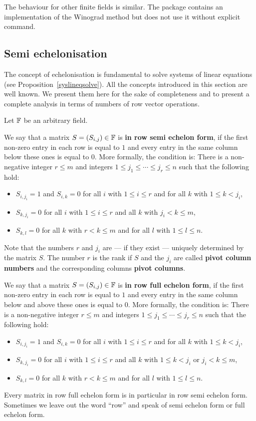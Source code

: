 The behaviour for other finite fields is similar. The {\cvec} package
contains an implementation of the Winograd method but does not use
it without explicit command.


\subsection{Semi echelonisation}

The concept of echelonisation is fundamental to solve systems of linear
equations (see Proposition~\ref{syslineqsolve}). All the concepts
introduced in this section are well known. We present them here for
the sake of completeness and to present a complete analysis in terms
of numbers of row vector operations.

\begin{Def}
Let $\mathbb{F}$ be an arbitrary field. 

We say that a matrix $S = (S_{i,j}) \in \mathbb{F}$
is \textbf{in row semi echelon form}, if the first non-zero entry in each
row is equal to $1$ and every entry in the same column below these ones
is equal to $0$. More formally, the condition is: There
is a non-negative integer $r \le m$ and integers $1 \le j_1 \le \cdots \le
j_r \le n$ such that the following hold:
\begin{itemize}
\item $S_{i,j_i} = 1$ and $S_{i,k} = 0$ for all $i$ with $1 \le i \le r$
and for all $k$ with $1 \le k < j_i$,
\item $S_{k,j_i} = 0$ for all $i$ with $1 \le i \le r$ and all $k$ with 
$j_i < k \le m$,
\item $S_{k,l} = 0$ for all $k$ with $r < k \le m$ and for all $l$ with
$1 \le l \le n$.
\end{itemize}
Note that the numbers $r$ and $j_i$ are --- if they exist --- uniquely
determined by the matrix $S$. The number $r$ is the rank if $S$ and
the $j_i$ are called \textbf{pivot column numbers} and the corresponding
columns \textbf{pivot columns}. 

We say that a matrix $S = (S_{i,j}) \in \mathbb{F}$
is \textbf{in row full echelon form}, if the first non-zero entry in each
row is equal to $1$ and every entry in the same column below and above
these ones is equal to $0$. More formally, the condition is: There
is a non-negative integer $r \le m$ and integers $1 \le j_1 \le \cdots \le
j_r \le n$ such that the following hold:
\begin{itemize}
\item $S_{i,j_i} = 1$ and $S_{i,k} = 0$ for all $i$ with $1 \le i \le r$
and for all $k$ with $1 \le k < j_i$,
\item $S_{k,j_i} = 0$ for all $i$ with $1 \le i \le r$ and all $k$ with 
$1 \le k < j_i$ or $j_i < k \le m$,
\item $S_{k,l} = 0$ for all $k$ with $r < k \le m$ and for all $l$ with
$1 \le l \le n$.
\end{itemize}
Every matrix in row full echelon form is in particular in row semi echelon form.
Sometimes we leave out the word ``row'' and speak of semi echelon form
or full echelon form. \ProofEnd
\end{Def}


